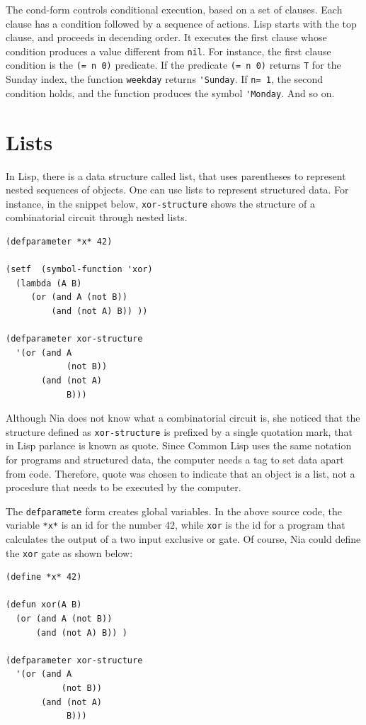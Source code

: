\documentclass[a4paper,12pt]{book}
\begin{document}
The cond-form controls conditional
execution, based on a set of clauses.
Each clause has a condition followed by
a sequence of actions.  Lisp starts with the
top clause, and proceeds in decending order.
It executes the first clause whose 
condition produces a value different from \verb|nil|.
For instance, the first clause condition is
the \verb|(= n 0)| predicate.
If the predicate \verb|(= n 0)| 
returns \verb|T| for the Sunday index,
the function \verb|weekday| returns \verb|'Sunday|.
If \verb|n= 1|, the second condition holds,
and the function produces the symbol \verb|'Monday|.
And so on.


\section{Lists}
In Lisp, there is a data structure called list,
that uses parentheses to represent nested
sequences of objects. One can use lists to
represent structured data.
For instance, in the snippet below,
\verb|xor-structure| shows
the structure of a combinatorial circuit
through nested lists.

\begin{verbatim}
(defparameter *x* 42)

(setf  (symbol-function 'xor)
  (lambda (A B)
     (or (and A (not B))
         (and (not A) B)) ))

(defparameter xor-structure
  '(or (and A
            (not B))
       (and (not A) 
            B)))
\end{verbatim}

Although Nia does not know what a combinatorial 
circuit is, she noticed that the structure
defined as \verb|xor-structure| is prefixed by a
single quotation mark, that in Lisp parlance is
known as quote. Since Common Lisp uses the
same notation for programs and structured
data, the computer needs a tag to set
data apart from code. Therefore, 
quote was chosen to indicate that
an object is a list, not a procedure that
needs to be executed by the computer.

The \verb|defparamete| form creates global variables.
In the above source code, the variable \verb|*x*| is
an id for the number 42, while \verb|xor| is the id for
a program that calculates the output of a two input
exclusive or gate. Of course, Nia could define the
\verb|xor| gate as shown below:
\begin{verbatim}
(define *x* 42)

(defun xor(A B)
  (or (and A (not B))
      (and (not A) B)) )

(defparameter xor-structure
  '(or (and A 
           (not B))
       (and (not A) 
            B)))
\end{verbatim}
\end{document}

